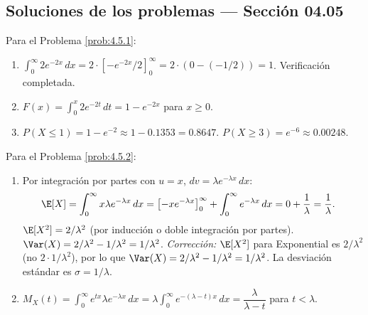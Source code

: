 \subsection*{Soluciones de los problemas --- Sección 04.05}

\begin{solucion}
	\label{sol:4.5.1}
	Para el Problema \ref{prob:4.5.1}:
	\begin{enumerate}
		\item $\int_{0}^{\infty} 2e^{-2x}\,dx = 2 \cdot [-e^{-2x}/2]_{0}^{\infty} = 2 \cdot (0 - (-1/2)) = 1$. Verificación completada.
		\item $F(x) = \int_{0}^{x} 2e^{-2t}\,dt = 1 - e^{-2x}$ para $x \ge 0$.
		\item $P(X \le 1) = 1 - e^{-2} \approx 1 - 0.1353 = 0.8647$. $P(X \ge 3) = e^{-6} \approx 0.00248$.
	\end{enumerate}
\end{solucion}

\begin{solucion}
	\label{sol:4.5.2}
	Para el Problema \ref{prob:4.5.2}:
	\begin{enumerate}
		\item Por integración por partes con $u = x$, $dv = \lambda e^{-\lambda x}\,dx$:
		\begin{align*}
			\E[X] &= \int_{0}^{\infty} x \lambda e^{-\lambda x}\,dx = \left[ -x e^{-\lambda x} \right]_{0}^{\infty} + \int_{0}^{\infty} e^{-\lambda x}\,dx = 0 + \frac{1}{\lambda} = \frac{1}{\lambda}.
		\end{align*}
		$\E[X^{2}] = 2/\lambda^{2}$ (por inducción o doble integración por partes). $\Var(X) = 2/\lambda^{2} - 1/\lambda^{2} = 1/\lambda^{2}$. \emph{Corrección:} $\E[X^{2}]$ para Exponential es $2/\lambda^{2}$ (no $2 \cdot 1/\lambda^{2}$), por lo que $\Var(X) = 2/\lambda^{2} - 1/\lambda^{2} = 1/\lambda^{2}$. La desviación estándar es $\sigma = 1/\lambda$.
		\item $M_{X}(t) = \int_{0}^{\infty} e^{tx} \lambda e^{-\lambda x}\,dx = \lambda \int_{0}^{\infty} e^{-(\lambda - t)x}\,dx = \dfrac{\lambda}{\lambda - t}$ para $t < \lambda$.
	\end{enumerate}
\end{solucion}

